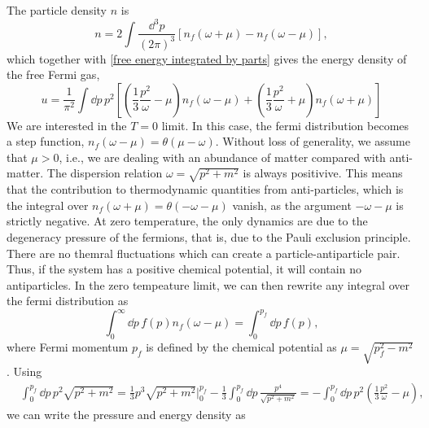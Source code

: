 %
The particle density $n$ is
%
\begin{equation}
    n = 2 \int \frac{\dd^3 p}{(2 \pi)^3}
    \left[
        n_f(\omega + \mu)
        -
        n_f(\omega - \mu)
    \right],
\end{equation}
%
which together with \autoref{free energy integrated by parts} gives the energy density of the free Fermi gas,
%
\begin{equation}
    u
    =
    \frac{1}{\pi^2}
    \int \dd p \,
    p^2
    \left[
        \left(
            \frac{1}{3}
            \frac{p^2}{\omega}
            -
            \mu
        \right)
        n_f(\omega - \mu)
        +
        \left(
            \frac{1}{3}
            \frac{p^2}{\omega}
            +
            \mu
        \right)
        n_f(\omega + \mu)
    \right]
\end{equation}
%
We are interested in the $T = 0$ limit.
In this case, the fermi distribution becomes a step function, $n_f(\omega - \mu) = \theta(\mu - \omega)$.
Without loss of generality, we assume that $\mu >0$, i.e., we are dealing with an abundance of matter compared with anti-matter.
The dispersion relation $\omega = \sqrt{p^2 + m^2}$ is always positivive.
This means that the contribution to thermodynamic quantities from anti-particles, which is the integral over $n_f(\omega + \mu) = \theta(-\omega - \mu)$ vanish, as the argument $-\omega - \mu$ is strictly negative.
At zero temperature, the only dynamics are due to the degeneracy pressure of the fermions, that is, due to the Pauli exclusion principle.
There are no themral fluctuations which can create a particle-antiparticle pair.
Thus, if the system has a positive chemical potential, it will contain no antiparticles.
In the zero tempeature limit, we can then rewrite any integral over the fermi distribution as
%
\begin{equation}
    \int_0^\infty \dd p \, f(p) n_f(\omega - \mu) = \int_0^{p_f} \dd p \, f(p),
\end{equation}
%
where Fermi momentum $p_f$ is defined by the chemical potential as $\mu = \sqrt{p_f^2 - m^2}$.
Using
%
\begin{align}
    &
    \int_0^{p_f} \dd p \, p^2 \sqrt{p^2 + m^2}
     = \frac{1}{3} p^3 \sqrt{p^2 + m^2 }\bigg|_0^{p_f} 
    - \frac{1}{3}\int_0^{p_f} \dd p \, \frac{p^4}{\sqrt{p^2 + m^2}}
    =
    -
    \int_0^{p_f}
    \dd p \, p^2
    \left(
        \frac{1}{3}
        \frac{p^2}{\omega}
        - \mu
    \right),
\end{align}
%
we can write the pressure and energy density as
